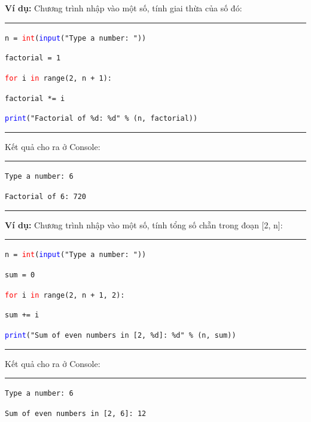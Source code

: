 \newpage
\textbf{Ví dụ:} Chương trình nhập vào một số, tính giai thừa của số đó:\\
\rule{\linewidth}{0.2mm}\par
\begin{linenumbers}
	\texttt{n = \textcolor{red}{int}(\textcolor{blue}{input}("Type a number: "))}\par
	\texttt{factorial = 1}\par
	\texttt{\textcolor{red}{for} i \textcolor{red}{in} range(2, n + 1):}\par
	\qquad \texttt{factorial *= i}\par
	\texttt{\textcolor{blue}{print}("Factorial of \%d: \%d" \% (n, factorial))}\par
\end{linenumbers}
\rule{\linewidth}{0.2mm}\par
\noindent
\resetlinenumber
Kết quả cho ra ở Console:\\
\rule{\linewidth}{0.2mm}\par
\begin{linenumbers}
	\texttt{Type a number: 6}\par
	\texttt{Factorial of 6: 720}\par
\end{linenumbers}
\rule{\linewidth}{0.2mm}\par
\resetlinenumber
\newpage
\textbf{Ví dụ:} Chương trình nhập vào một số, tính tổng số chẵn trong đoạn [2, n]:\\
\rule{\linewidth}{0.2mm}\par
\begin{linenumbers}
	\texttt{n = \textcolor{red}{int}(\textcolor{blue}{input}("Type a number: "))}\par
	\texttt{sum = 0}\par
	\texttt{\textcolor{red}{for} i \textcolor{red}{in} range(2, n + 1, 2):}\par
	\qquad \texttt{sum += i}\par
	\texttt{\textcolor{blue}{print}("Sum of even numbers in [2, \%d]: \%d" \% (n, sum))}\par
\end{linenumbers}
\rule{\linewidth}{0.2mm}\par
\noindent
\resetlinenumber
Kết quả cho ra ở Console:\\
\rule{\linewidth}{0.2mm}\par
\begin{linenumbers}
	\texttt{Type a number: 6}\par
	\texttt{Sum of even numbers in [2, 6]: 12}\par
\end{linenumbers}
